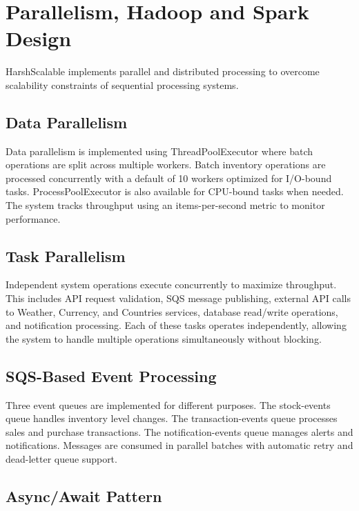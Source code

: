 \documentclass[conference]{IEEEtran}
\begin{document}
\section{Parallelism, Hadoop and Spark Design}
\label{sec:parallelism}

HarshScalable implements parallel and distributed processing to overcome scalability constraints of sequential processing systems.

\subsection{Data Parallelism}

Data parallelism is implemented using ThreadPoolExecutor where batch operations are split across multiple workers. Batch inventory operations are processed concurrently with a default of 10 workers optimized for I/O-bound tasks. ProcessPoolExecutor is also available for CPU-bound tasks when needed. The system tracks throughput using an items-per-second metric to monitor performance.

\subsection{Task Parallelism}

Independent system operations execute concurrently to maximize throughput. This includes API request validation, SQS message publishing, external API calls to Weather, Currency, and Countries services, database read/write operations, and notification processing. Each of these tasks operates independently, allowing the system to handle multiple operations simultaneously without blocking.

\subsection{SQS-Based Event Processing}

Three event queues are implemented for different purposes. The stock-events queue handles inventory level changes. The transaction-events queue processes sales and purchase transactions. The notification-events queue manages alerts and notifications. Messages are consumed in parallel batches with automatic retry and dead-letter queue support.

\subsection{Async/Await Pattern}
\end{document}
